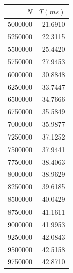 \documentclass[13pt]{beamer}
\begin{document}
\begin{frame}
\begin{columns}
            \begin{column}{0.2\textwidth}
                \begin{table}
                    \tiny
                    \centering
                    \begin{tabular}{|r|r|}
                        \hline
                        $N$ & $T(ms)$ \\
                        \hline

                        5000000 & 21.6910 \\ 
                        5250000 & 22.3115 \\ 
                        5500000 & 25.4420 \\ 
                        5750000 & 27.9453 \\ 
                        6000000 & 30.8848 \\ 
                        6250000 & 33.7447 \\ 
                        6500000 & 34.7666 \\ 
                        6750000 & 35.5849 \\ 
                        7000000 & 35.9877 \\ 
                        7250000 & 37.1252 \\ 
                        7500000 & 37.9441 \\ 
                        7750000 & 38.4063 \\ 
                        8000000 & 38.9629 \\ 
                        8250000 & 39.6185 \\ 
                        8500000 & 40.0429 \\ 
                        8750000 & 41.1611 \\ 
                        9000000 & 41.9953 \\ 
                        9250000 & 42.0843 \\ 
                        9500000 & 42.5158 \\ 
                        9750000 & 42.8710 \\ 

                        \hline
                    \end{tabular}
                \end{table}
            \end{column}


\end{columns}
\end{frame}
\end{document}
